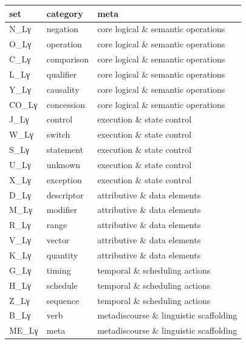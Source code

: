 {\small
\setlength{\tabcolsep}{6pt}
\begin{longtable}{>{\RaggedRight\arraybackslash}p{}>{\RaggedRight\arraybackslash}p{}>{\RaggedRight\arraybackslash}p{}}
\toprule
set & category & meta \\
\midrule
\endhead
N\_\allowbreak{}Lγ & negation & core logical \& semantic operations \\
O\_\allowbreak{}Lγ & operation & core logical \& semantic operations \\
C\_\allowbreak{}Lγ & comparison & core logical \& semantic operations \\
L\_\allowbreak{}Lγ & qualifier & core logical \& semantic operations \\
Y\_\allowbreak{}Lγ & causality & core logical \& semantic operations \\
CO\_\allowbreak{}Lγ & concession & core logical \& semantic operations \\
J\_\allowbreak{}Lγ & control & execution \& state control \\
W\_\allowbreak{}Lγ & switch & execution \& state control \\
S\_\allowbreak{}Lγ & statement & execution \& state control \\
U\_\allowbreak{}Lγ & unknown & execution \& state control \\
X\_\allowbreak{}Lγ & exception & execution \& state control \\
D\_\allowbreak{}Lγ & descriptor & attributive \& data elements \\
M\_\allowbreak{}Lγ & modifier & attributive \& data elements \\
R\_\allowbreak{}Lγ & range & attributive \& data elements \\
V\_\allowbreak{}Lγ & vector & attributive \& data elements \\
K\_\allowbreak{}Lγ & quantity & attributive \& data elements \\
G\_\allowbreak{}Lγ & timing & temporal \& scheduling actions \\
H\_\allowbreak{}Lγ & schedule & temporal \& scheduling actions \\
Z\_\allowbreak{}Lγ & sequence & temporal \& scheduling actions \\
B\_\allowbreak{}Lγ & verb & metadiscourse \& linguistic scaffolding \\
ME\_\allowbreak{}Lγ & meta & metadiscourse \& linguistic scaffolding \\

\end{longtable}}
